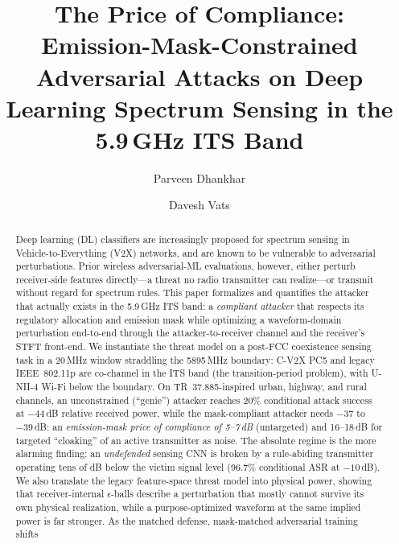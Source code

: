 \documentclass[review]{elsarticle}
\begin{document}
\begin{frontmatter}

\title{The Price of Compliance: Emission-Mask-Constrained Adversarial Attacks
on Deep Learning Spectrum Sensing in the 5.9\,GHz ITS Band}

\author[inst1]{Parveen Dhankhar}
\author[inst1]{Davesh Vats}


\begin{abstract}
Deep learning (DL) classifiers are increasingly proposed for spectrum sensing
in Vehicle-to-Everything (V2X) networks, and are known to be vulnerable to
adversarial perturbations. Prior wireless adversarial-ML evaluations, however,
either perturb receiver-side features directly---a threat no radio transmitter
can realize---or transmit without regard for spectrum rules. This paper
formalizes and quantifies the attacker that actually exists in the 5.9\,GHz ITS
band: a \emph{compliant attacker} that respects its regulatory allocation and
emission mask while optimizing a waveform-domain perturbation end-to-end
through the attacker-to-receiver channel and the receiver's STFT front-end. We
instantiate the threat model on a post-FCC coexistence sensing task in a
20\,MHz window straddling the 5895\,MHz boundary: C-V2X PC5 and legacy
IEEE~802.11p are co-channel in the ITS band (the transition-period problem),
with U-NII-4 Wi-Fi below the boundary. On TR~37.885-inspired urban, highway,
and rural channels, an unconstrained (``genie'') attacker reaches 20\% conditional attack
success at $-44$\,dB relative received power, while the mask-compliant attacker
needs $-37$ to $-39$\,dB: an \emph{emission-mask price of compliance of
5--7\,dB} (untargeted) and 16--18\,dB for targeted ``cloaking'' of an active
transmitter as noise. The absolute regime is the more alarming finding: an
\emph{undefended} sensing CNN is broken by a rule-abiding transmitter operating
tens of dB below the victim signal level (96.7\% conditional ASR at
$-10$\,dB). We also translate the legacy feature-space threat model into
physical power, showing that receiver-internal $\epsilon$-balls describe a
perturbation that mostly cannot survive its own physical realization, while
a purpose-optimized waveform at the same implied power is far stronger. As the matched defense, mask-matched adversarial training shifts

\end{abstract}
\end{frontmatter}
\end{document}

